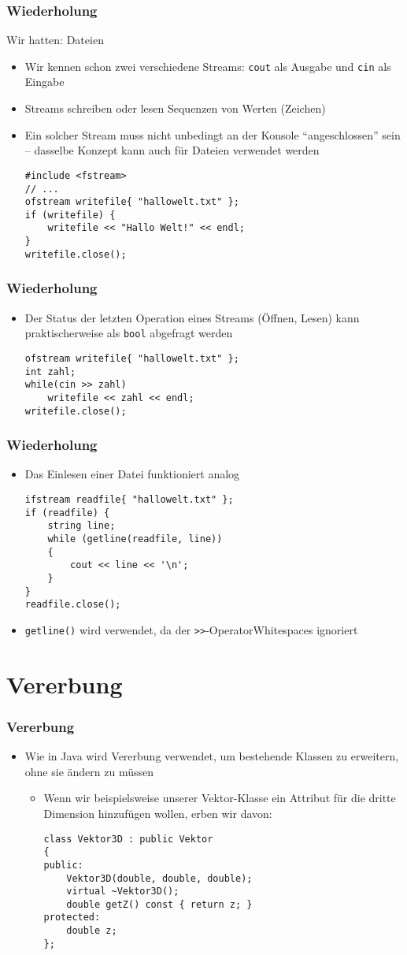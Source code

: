 \documentclass[]{beamer}
\newcommand{\bi}{\begin{itemize}}
\newcommand{\ei}{\end{itemize}}
\begin{document}
\begin{frame}[fragile]
	\frametitle{Wiederholung}
Wir hatten: Dateien
	\bi
	\item Wir kennen schon zwei verschiedene Streams: \lstinline|cout| als Ausgabe und \lstinline|cin| als Eingabe
	\item Streams schreiben oder lesen Sequenzen von Werten (Zeichen)
	\item Ein solcher Stream muss nicht unbedingt an der Konsole "`angeschlossen"' sein -- dasselbe Konzept kann auch für Dateien verwendet werden
\small
	\begin{lstlisting}
#include <fstream>
// ...
ofstream writefile{ "hallowelt.txt" };
if (writefile) {
	writefile << "Hallo Welt!" << endl;
}
writefile.close();
	\end{lstlisting}
\normalsize
	\ei
\end{frame}

\begin{frame}[fragile]
	\frametitle{Wiederholung}
	\bi
	\item Der Status der letzten Operation eines Streams (Öffnen, Lesen) kann praktischerweise als \lstinline|bool| abgefragt werden
	\begin{lstlisting}
ofstream writefile{ "hallowelt.txt" };
int zahl;
while(cin >> zahl)
	writefile << zahl << endl;
writefile.close();
	\end{lstlisting}
	\ei
\end{frame}

\begin{frame}[fragile]
	\frametitle{Wiederholung}
	\bi
	\item Das Einlesen einer Datei funktioniert analog
	\begin{lstlisting}
ifstream readfile{ "hallowelt.txt" };
if (readfile) {
	string line;
	while (getline(readfile, line))
	{
		cout << line << '\n';
	}
}
readfile.close();
	\end{lstlisting}
	\item \lstinline|getline()| wird verwendet, da der \lstinline|>>|-Operator\newline Whitespaces ignoriert
	\ei
\end{frame}

\section{Vererbung}

\begin{frame}[fragile]
	\frametitle{Vererbung}
	\bi
	\item Wie in Java wird Vererbung verwendet, um bestehende Klassen zu erweitern, ohne sie ändern zu müssen
	\bi
	\item Wenn wir beispielsweise unserer Vektor-Klasse ein Attribut für die dritte Dimension hinzufügen wollen, erben wir davon:
	\begin{lstlisting}
class Vektor3D : public Vektor
{
public:
	Vektor3D(double, double, double);
	virtual ~Vektor3D();
	double getZ() const { return z; }
protected:
	double z;
};
	\end{lstlisting}
	\ei
	\ei
\end{frame}
\end{document}
